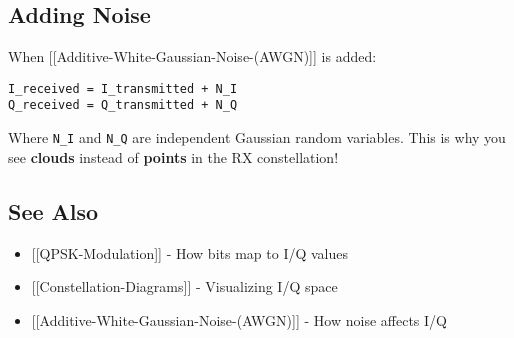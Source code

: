 \subsection{Adding Noise}\label{adding-noise}

When {[}{[}Additive-White-Gaussian-Noise-(AWGN){]}{]} is added:

\begin{verbatim}
I_received = I_transmitted + N_I
Q_received = Q_transmitted + N_Q
\end{verbatim}

Where \texttt{N\_I} and \texttt{N\_Q} are independent Gaussian random
variables. This is why you see \textbf{clouds} instead of
\textbf{points} in the RX constellation!

\subsection{See Also}\label{see-also}

\begin{itemize}
\tightlist
\item
  {[}{[}QPSK-Modulation{]}{]} - How bits map to I/Q values
\item
  {[}{[}Constellation-Diagrams{]}{]} - Visualizing I/Q space
\item
  {[}{[}Additive-White-Gaussian-Noise-(AWGN){]}{]} - How noise affects
  I/Q
\end{itemize}
